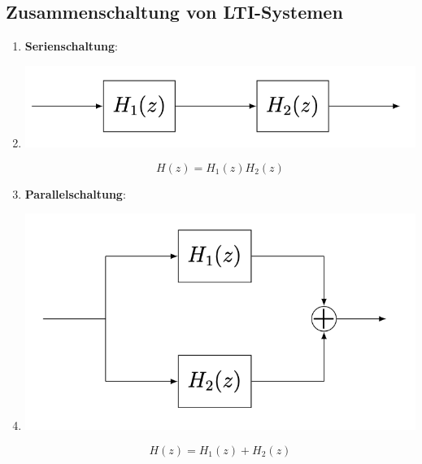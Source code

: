\documentclass[11pt]{article}
\begin{document}
\subsection*{Zusammenschaltung von LTI-Systemen}
\begin{enumerate}
    \item \textbf{Serienschaltung}:
    \item[] \noindent
            \begin{minipage}[t]{0.45\textwidth}
            \includegraphics[width=\linewidth]{docimgs/Serienschaltung.png}
            \end{minipage}
            \hfill
            \begin{minipage}[c]{0.45\textwidth}
            $$H(z) = H_1(z)H_2(z)$$
            \vspace*{0.77cm}
            \end{minipage}
    \vspace*{-1cm}
    \item \textbf{Parallelschaltung}:
    \item[] \noindent
            \begin{minipage}[t]{0.45\textwidth}
            \includegraphics[width=\linewidth]{docimgs/Parallelschaltung.png}
            \end{minipage}
            \hfill
            \begin{minipage}[c]{0.45\textwidth}
            $$H(z) = H_1(z) + H_2(z)$$
            \vspace*{3.45cm}
            \end{minipage}

\end{enumerate}
\end{document}
